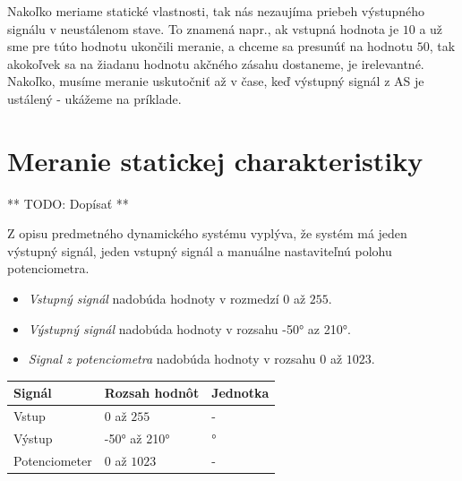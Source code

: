 \documentclass[a4paper, 10pt, ]{article}
\begin{document}
Nakoľko meriame statické vlastnosti, tak nás nezaujíma priebeh výstupného signálu v neustálenom stave. To znamená napr., ak vstupná hodnota je $10$ a už sme pre túto hodnotu ukončili meranie, a chceme sa presunúť na hodnotu $50$, tak akokoľvek sa na žiadanu hodnotu akčného zásahu dostaneme, je irelevantné. Nakoľko, musíme meranie uskutočniť až v čase, keď výstupný signál z AS je ustálený - ukážeme na príklade.


\section{Meranie statickej charakteristiky}

** TODO: Dopísať **

Z opisu predmetného dynamického systému vyplýva, že systém má jeden výstupný signál, jeden vstupný signál a manuálne nastaviteľnú polohu potenciometra.

\begin{itemize}
    \item \emph{Vstupný signál} nadobúda hodnoty v rozmedzí $0$ až $255$.

    \item \emph{Výstupný signál} nadobúda hodnoty v rozsahu \ang{-50} az \ang{210}.

    \item \emph{Signal z potenciometra} nadobúda hodnoty v rozsahu $0$ až $1023$.
\end{itemize}


\begin{center}

    \vspace{-10pt}

    \label{tab:rozsahy_a_jednotky_signalu}

    \lstyle

    \begin{tabular*}{\textwidth}{@{ \extracolsep{\fill}} lll}
        \toprule
        Signál & Rozsah hodnôt & Jednotka \\
        \midrule
        Vstup & $0$ až $255$ & - \\
        Výstup & \ang{-50} až \ang{210} & \si{\degree} \\
        Potenciometer & $0$ až $1023$ & - \\
        \bottomrule
    \end{tabular*}


\end{center}
\end{document}
